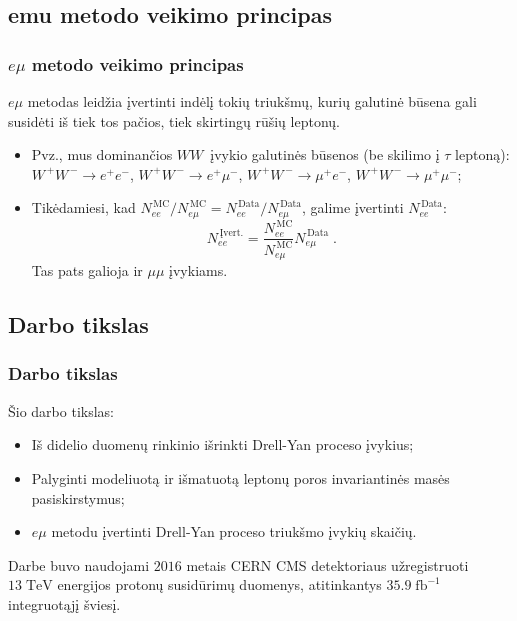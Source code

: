 \documentclass[xcolor=dvipsnames]{beamer}
\newcommand{\emu}{\mathit{e}\mu}
\newcommand{\ee}{\mathit{ee}}
\newcommand{\mumu}{\mu\mu}
\newcommand{\WW}{\mathit{WW}}
\newcommand{\WWpm}{\mathit{W^{\,+}\!W^{\,-}}}
\newcommand{\ZZ}{\mathit{ZZ}}
\newcommand{\WZ}{\mathit{WZ}}
\newcommand{\DYtau}{\mathrm{DY} \! \rightarrow \! \tau\tau}
\newcommand{\ttbar}{\mathit{t}\overline{\mathit{t}}}
\newcommand{\tbarW}{\overline{\mathit{t}}\mathit{W}}
\newcommand{\tW}{\mathit{tW}}
\newcommand{\MC}{\mathrm{MC}}
\newcommand{\Data}{\mathrm{Data}}
\begin{document}
\begin{frame}
	\section{emu metodo veikimo principas}
	\frametitle{$\emu$ metodo veikimo principas}
	\large $\emu$ metodas leidžia įvertinti indėlį tokių triukšmų, kurių galutinė būsena gali susidėti iš tiek tos pačios,
	tiek skirtingų rūšių leptonų.
	\medskip
	\normalsize
	\begin{itemize}
		\item Pvz., mus dominančios $\WW\,$ įvykio galutinės būsenos (be skilimo į $\tau$ leptoną):\\[3mm]
		$\WWpm\!\!\rightarrow\!\mathit{e^{+}\!e^{-}}$, $\WWpm\!\!\rightarrow\!\mathit{e^{+}\!\mu^{-}}$,
		$\WWpm\!\!\rightarrow\!\mathit{\mu^{+}\!e^{-}}$, $\WWpm\!\!\rightarrow\!\mu^{+}\!\mu^{-}$;
		\vspace{0.3cm}
		\item Tikėdamiesi, kad $\mathit{N}_{\ee}^{\,\MC}/\mathit{N}_{\emu}^{\,\MC}=\mathit{N}_{\ee}^{\,\Data}/\mathit{N}_{\emu}^{\,\Data}$,
		galime įvertinti $\mathit{N}_{\ee}^{\,\Data}$:
		\begin{equation*}
			\mathit{N}_{\ee}^{\,\mathrm{Įvert.}} = \frac{\mathit{N}_{\ee}^{\,\MC}}{\mathit{N}_{\emu}^{\,\MC}}
												\mathit{N}_{\emu}^{\,\Data} \; .
		\end{equation*}
		Tas pats galioja ir $\mumu$ įvykiams.
	\end{itemize}
\end{frame}


\begin{frame}
	\section{Darbo tikslas}
	\frametitle{Darbo tikslas}
	Šio darbo tikslas:
	\begin{itemize}
		\item Iš didelio duomenų rinkinio išrinkti Drell-Yan proceso įvykius;
		\item Palyginti modeliuotą ir išmatuotą leptonų poros invariantinės masės pasiskirstymus;
		\item $\emu$ metodu įvertinti Drell-Yan proceso triukšmo įvykių skaičių.
	\end{itemize}
	\vspace{0.5cm}
	\small Darbe buvo naudojami $2016$ metais CERN CMS detektoriaus užregistruoti $13 \; \mathrm{TeV}$ energijos
	protonų susidūrimų duomenys, atitinkantys $35.9 \; \mathrm{fb}^{-1}$ integruotąjį šviesį.
\end{frame}
\end{document}
